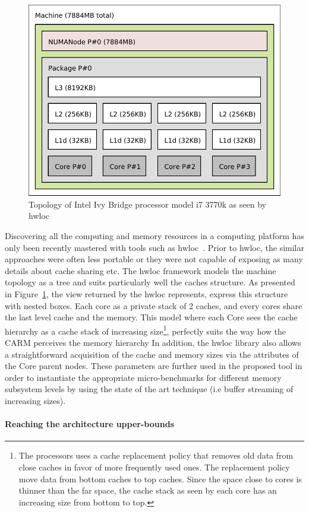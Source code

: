 \documentclass[twoside,twocolumn,8pt]{extarticle}
\begin{document}
\begin{figure}
  \includegraphics[width=.5\textwidth]{pictures/i7_3770k.pdf}
  \caption{Topology of Intel Ivy Bridge processor model i7 3770k as seen by hwloc}
  \label{fig:topology_adriana}
\end{figure}

Discovering all the computing and memory resources in a computing platform has only been recently mastered with tools such as
hwloc~\cite{goglin:hal-01330194}. Prior to hwloc,  the similar approaches were often less portable or they were not capable of
exposing as many details about cache sharing etc. The hwloc framework models the machine topology as a tree and suits particularly
well the caches structure.
As presented in Figure~\ref{fig:topology_adriana}, the view returned by the hwloc represents, express this structure with nested
boxes. Each core as a private stack of 2 caches, and every cores share the last level cache and the memory. This model where each
Core sees  the cache hierarchy as a cache stack of increasing size\footnote{
  The processors uses a cache replacement policy that removes old data from
  close caches in favor of more frequently used ones. The replacement policy move data from bottom caches to top caches. Since the
  space close to cores is thinner than the far space, the cache stack as seen by each core has an increasing size from bottom to
  top.
}, perfectly suits the way how the CARM perceives the memory hierarchy 
In addition, the hwloc library also allows a straightforward acquisition  of the cache and memory sizes via the  attributes of the
Core parent nodes. These parameters are further used in the proposed tool  in order to instantiate the appropriate micro-benchmarks
for different memory subsystem levels by using the state of the art technique (i.e buffer streaming of increasing sizes).

\paragraph*{Reaching the architecture upper-bounds}
\end{document}
